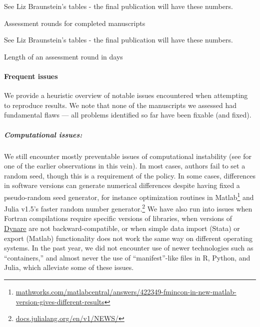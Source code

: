 \documentclass[PP]{AEA}
\begin{document}
\begin{table}
    \centering
    See Liz Braunstein's tables - the final publication will have these numbers.
    \caption{Assessment rounds for completed manuscripts}
    \label{tab:pre:rounds}
\end{table}

\begin{table}
    \centering
See Liz Braunstein's tables - the final publication will have these numbers.
    \caption{Length of an assessment round in days}
    \label{tab:pre:round_length}
\end{table}


\paragraph{Frequent issues}

We provide a heuristic overview of notable issues  encountered when attempting to reproduce results. We note that none of the \jiramcs{} manuscripts we assessed had  fundamental flaws --- all problems identified so far have been fixable (and fixed). 

\subparagraph{Computational issues:}  We still encounter mostly preventable issues of computational instability (see \citet{mccullough_numerical_1999} for one of the earlier observations in this vein). In most cases, authors fail to set a random seed, though this is a requirement of the policy. In some cases, differences in software versions can generate numerical differences despite having fixed a pseudo-random seed generator, for instance optimization routines in Matlab\footnote{\href{https://it.mathworks.com/matlabcentral/answers/422349-fmincon-in-new-matlab-version-gives-different-results}{mathworks.com/matlabcentral/answers/422349-fmincon-in-new-matlab-version-gives-different-results}} and Julia v1.5's faster random number generator.\footnote{\href{https://web.archive.org/web/20201216032133/https://docs.julialang.org/en/v1/NEWS/}{docs.julialang.org/en/v1/NEWS/}} We have also run into issues when Fortran compilations require specific versions of libraries, when versions of \href{https://www.dynare.org/}{Dynare} are not backward-compatible, or when simple data import (Stata) or export (Matlab) functionality does not work the same way on different operating systems. In the past year, we did not encounter use of newer technologies such as ``containers,'' and almost never the use of ``manifest''-like files in R, Python, and Julia, which alleviate some of these issues.  
\end{document}
